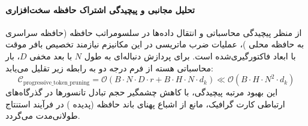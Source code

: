 \paragraph{تحلیل مجانبی و پیچیدگی اشتراک حافظه سخت‌افزاری}
از منظر پیچیدگی محاسباتی و انتقال داده‌ها در سلسومراتب حافظه (حافظه سراسری  به حافظه محلی )، عملیات ضرب ماتریسی در این مکانیزم نیازمند تخصیص بافر موقت با ابعاد فاکتورگیری‌شده است. برای پردازش دنباله‌ای به طول $N$ با بعد مخفی $D$، بار محاسباتی هسته از فرم درجه دو به رابطه زیر تقلیل می‌یابد:
\begin{equation}
\label{eq:complexity_progressive_token_pruning}
\mathcal{C}_{\text{progressive\_token\_pruning}} = \mathcal{O}\left( B \cdot N \cdot D \cdot r + B \cdot H \cdot N \cdot d_k \right) \ll \mathcal{O}\left( B \cdot H \cdot N^2 \cdot d_k \right)
\end{equation}
این بهبود مرتبه پیچیدگی، با کاهش چشمگیر حجم تبادل تانسورها در گذرگاه‌های ارتباطی کارت گرافیک، مانع از اشباع پهنای باند حافظه (پدیده ) در فرآیند استنتاج طولانی‌مدت می‌گردد.